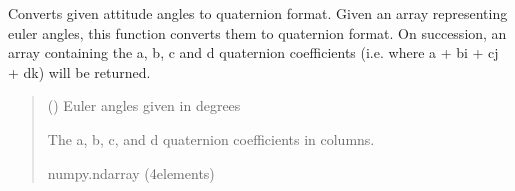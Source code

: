 \documentclass[letterpaper,10pt,english]{sphinxmanual}
\begin{document}
\begin{fulllineitems}
\label{\detokenize{modules/util/transformations:qnav.util.transformations.euler_to_quaternion}}
\pysigstartsignatures
{}
\pysigstopsignatures
\sphinxAtStartPar
Converts given attitude angles to quaternion format.
Given an array representing euler angles, this function converts them to
quaternion format. On succession, an array containing the a, b, c and d
quaternion coefficients (i.e. where a + bi + cj + dk) will be returned.
\begin{quote}\begin{description}
\sphinxAtStartPar
{} (\sphinxstyleliteralemphasis{\sphinxupquote{ (}}\sphinxstyleliteralemphasis{\sphinxupquote{)}}) \textendash{} Euler angles given in degrees

\sphinxAtStartPar
The a, b, c, and d quaternion coefficients in columns.

\sphinxAtStartPar
numpy.ndarray (4\sphinxhyphen{}elements)

\end{description}\end{quote}

\end{fulllineitems}

\end{document}
